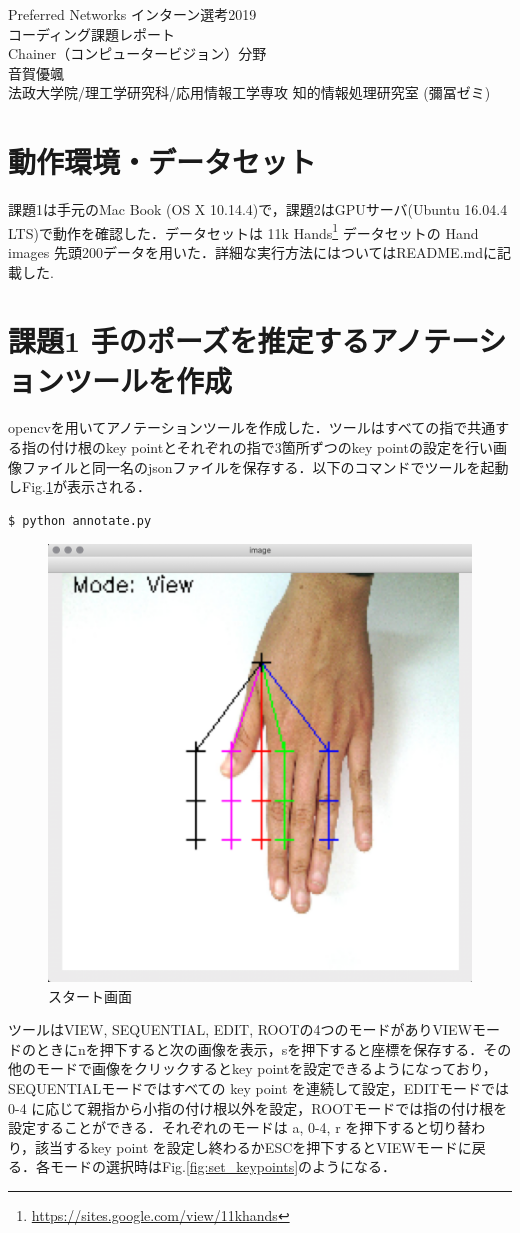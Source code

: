 \documentclass[a4paper, 11pt]{article}
\newcommand{\figref}[1]{Fig.\hspace{1mm}\ref{#1}}
\begin{document}
\begin{center}
\LARGE{Preferred Networks インターン選考2019\\ コーディング課題レポート\\ Chainer（コンピュータービジョン）分野} \\
\vspace{5mm}
\Large{音賀優颯} \\ \large{法政大学院/理工学研究科/応用情報工学専攻 知的情報処理研究室 (彌冨ゼミ)}
\end{center}
\vspace{5mm}

\section*{動作環境・データセット} 
課題1は手元のMac Book (OS X 10.14.4)で，課題2はGPUサーバ(Ubuntu 16.04.4 LTS)で動作を確認した．データセットは 11k Hands\footnote{\url{https://sites.google.com/view/11khands}} データセットの Hand images 先頭200データを用いた．詳細な実行方法にはついてはREADME.mdに記載した.

\section*{課題1 手のポーズを推定するアノテーションツールを作成} 
opencvを用いてアノテーションツールを作成した．ツールはすべての指で共通する指の付け根のkey pointとそれぞれの指で3箇所ずつのkey pointの設定を行い画像ファイルと同一名のjsonファイルを保存する．以下のコマンドでツールを起動し\figref{fig:startup}が表示される．

\begin{lstlisting}[language=bash]
  $ python annotate.py
\end{lstlisting}

\begin{figure}[H]
  \begin{center}
    \includegraphics[width=0.25\linewidth]{./imgs/start.png}
  \end{center}
	\caption{スタート画面}
	\label{fig:startup}
\end{figure}

ツールはVIEW, SEQUENTIAL, EDIT, ROOTの4つのモードがありVIEWモードのときにnを押下すると次の画像を表示，sを押下すると座標を保存する．その他のモードで画像をクリックするとkey pointを設定できるようになっており，SEQUENTIALモードではすべての key point を連続して設定，EDITモードでは 0-4 に応じて親指から小指の付け根以外を設定，ROOTモードでは指の付け根を設定することができる．それぞれのモードは a, 0-4, r を押下すると切り替わり，該当するkey point を設定し終わるかESCを押下するとVIEWモードに戻る．各モードの選択時は\figref{fig:set_keypoints}のようになる．
\end{document}
